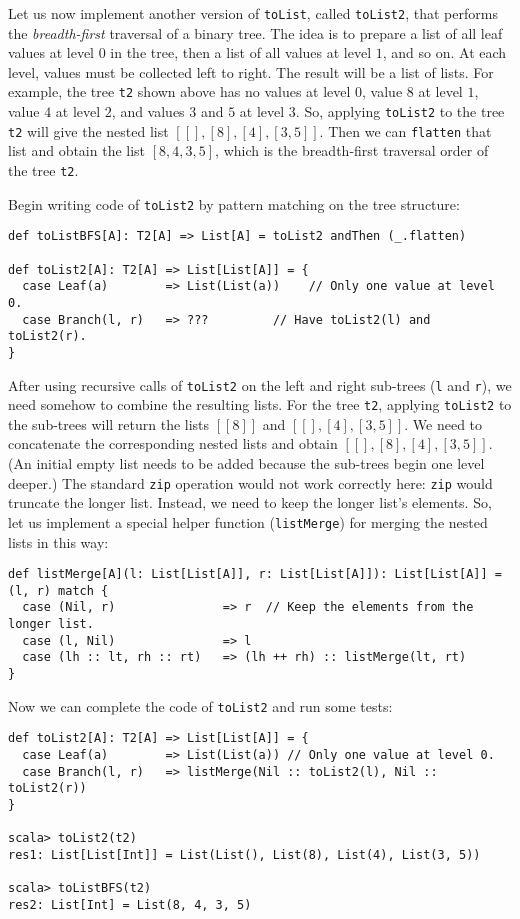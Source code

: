 Let us now implement another version of \lstinline!toList!, called
\lstinline!toList2!, that performs the \emph{breadth-first} traversal
of a binary tree. The idea is to prepare a list of all leaf values
at level $0$ in the tree, then a list of all values at level $1$,
and so on. At each level, values must be collected left to right.
The result will be a list of lists. For example, the tree \lstinline!t2!
shown above has no values at level $0$, value $8$ at level $1$,
value $4$ at level $2$, and values $3$ and $5$ at level $3$.
So, applying \lstinline!toList2! to the tree \lstinline!t2! will
give the nested list $\left[\left[\right],\left[8\right],\left[4\right],\left[3,5\right]\right]$.
Then we can \lstinline!flatten! that list and obtain the list $\left[8,4,3,5\right]$,
which is the breadth-first traversal order of the tree \lstinline!t2!. 

Begin writing code of \lstinline!toList2! by pattern matching on
the tree structure:
\begin{lstlisting}
def toListBFS[A]: T2[A] => List[A] = toList2 andThen (_.flatten)

def toList2[A]: T2[A] => List[List[A]] = {
  case Leaf(a)        => List(List(a))    // Only one value at level 0.
  case Branch(l, r)   => ???         // Have toList2(l) and toList2(r).
}
\end{lstlisting}
After using recursive calls of \lstinline!toList2! on the left and
right sub-trees (\lstinline!l! and \lstinline!r!), we need somehow
to combine the resulting lists. For the tree \lstinline!t2!, applying
\lstinline!toList2! to the sub-trees will return the lists $\left[\left[8\right]\right]$
and $\left[\left[\right],\left[4\right],\left[3,5\right]\right]$.
We need to concatenate the corresponding nested lists and obtain $\left[\left[\right],\left[8\right],\left[4\right],\left[3,5\right]\right]$.
(An initial empty list needs to be added because the sub-trees begin
one level deeper.) The standard \lstinline!zip! operation would not
work correctly here: \lstinline!zip! would truncate the longer list.
Instead, we need to keep the longer list\textsf{'}s elements. So, let us implement
a special helper function (\lstinline!listMerge!) for merging the
nested lists in this way:
\begin{lstlisting}
def listMerge[A](l: List[List[A]], r: List[List[A]]): List[List[A]] = (l, r) match {
  case (Nil, r)               => r  // Keep the elements from the longer list.
  case (l, Nil)               => l
  case (lh :: lt, rh :: rt)   => (lh ++ rh) :: listMerge(lt, rt)
}
\end{lstlisting}
Now we can complete the code of \lstinline!toList2! and run some
tests:
\begin{lstlisting}
def toList2[A]: T2[A] => List[List[A]] = {
  case Leaf(a)        => List(List(a)) // Only one value at level 0.
  case Branch(l, r)   => listMerge(Nil :: toList2(l), Nil :: toList2(r))
}

scala> toList2(t2)
res1: List[List[Int]] = List(List(), List(8), List(4), List(3, 5))

scala> toListBFS(t2)
res2: List[Int] = List(8, 4, 3, 5)
\end{lstlisting}

